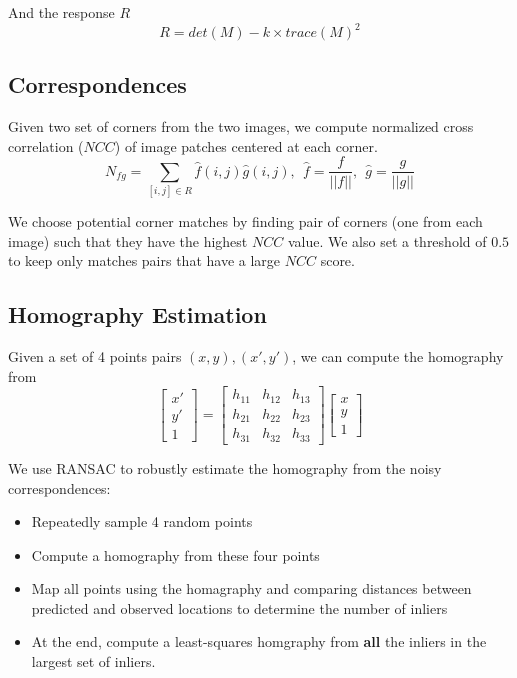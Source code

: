 \documentclass[letterpaper, 10 pt, conference]{ieeeconf}
\begin{document}
And the response $R$
\begin{equation}
R=det(M) - k\times trace(M)^2
\end{equation}

\subsection{Correspondences}
Given two set of corners from the two images, we compute normalized cross correlation ($NCC$) of image patches centered at each corner. 
\begin{equation}
N_{fg} = \sum_{[i, j]\in R}\hat{f}(i, j)\hat{g}(i, j),\ \ \hat{f} = \frac{f}{||f||}, \ \  \hat{g} = \frac{g}{||g||}
\end{equation}

We choose potential corner matches by finding pair of corners (one from each image) such that they have the highest $NCC$ value. We also set a threshold of $0.5$ to keep only matches pairs that have a large $NCC$ score.
\subsection{Homography Estimation}
Given a set of 4 points pairs $(x,y), (x', y')$, we can compute the homography from
\begin{equation}
\left[ \begin{array}{c}
x'\\
y'\\
1
\end{array} \right] = \left[ \begin{array}{ccc}
h_{11} & h_{12} & h_{13} \\
h_{21} & h_{22} & h_{23} \\
h_{31} & h_{32} & h_{33} 
\end{array} \right]\left[ \begin{array}{c}
x\\
y\\
1
\end{array} \right] 
\end{equation}

We use RANSAC to robustly estimate the homography from the noisy correspondences:
\begin{itemize}
\item Repeatedly sample 4 random points
\item Compute a homography from these four points
\item Map all points using the homagraphy and comparing distances between predicted and observed locations to determine the number of inliers
\item At the end, compute a least-squares homgraphy from \textbf{all} the inliers in the largest set of inliers.
\end{itemize}
\end{document}
